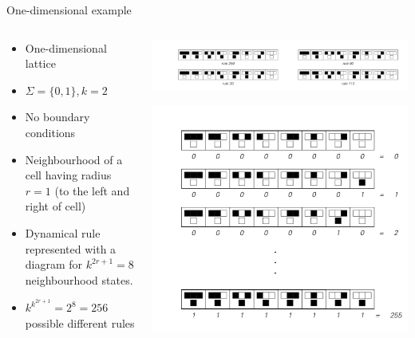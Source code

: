\begin{frame}{One-dimensional example}
 
  \begin{columns}
	\begin{column}{0.5\textwidth}
	  \begin{itemize}
	  \item One-dimensional lattice
	  \item $\Sigma =\{0,1\}, k = 2$
	  \item No boundary conditions
        \item Neighbourhood of a cell having radius $r=1$ (to the left and right of cell) 
        \item Dynamical rule represented with a diagram for $k^{2r+1} = 8$ neighbourhood states.
        \item $k^{k^{2r+1}}=2^8= 256$ possible different rules 
	  \end{itemize}
   	  
	\end{column}
	\begin{column}{0.7\textwidth}
 \includegraphics[height=0.18\textheight]{slike/rules.jpeg}
        \centering
        
        \includegraphics[height=0.6\textheight]{slike/PossibleRules.jpeg}
        \end{column}
    \end{columns}
\end{frame}
